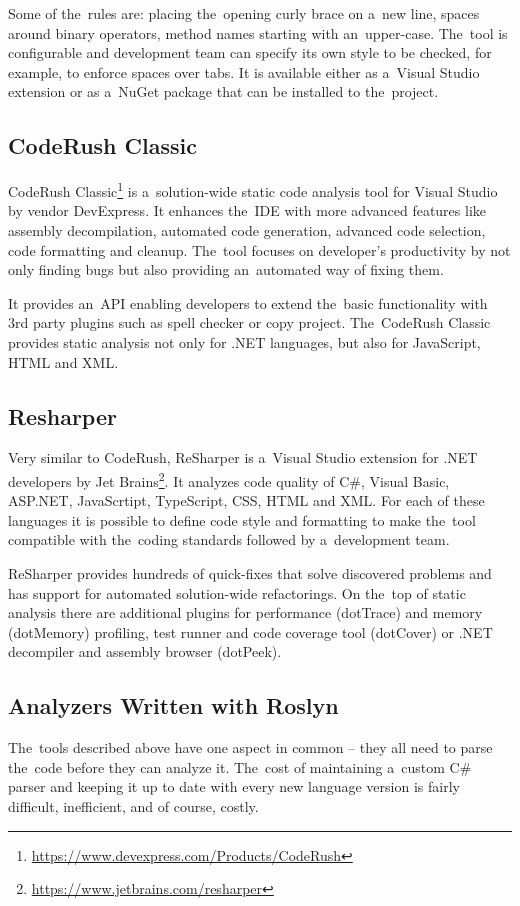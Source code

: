 \documentclass[
  digital, %
  table,   %
  lof,     %
  lot,     %
  oneside,
]{fithesis3}
\begin{document}
Some of the~rules are: placing the~opening curly brace on a~new line, spaces around binary operators, method names starting with an~upper-case. The~tool is configurable and development team can specify its own style to be checked, for example, to enforce spaces over tabs. It is available either as a~Visual Studio extension or as a~NuGet package that can be installed to the~project.

\subsection{CodeRush Classic}
CodeRush Classic\footnote{\url{https://www.devexpress.com/Products/CodeRush}} is a~solution-wide static code analysis tool for Visual Studio by vendor DevExpress. It enhances the~IDE with more advanced features like assembly decompilation, automated code generation, advanced code selection, code formatting and cleanup. The~tool focuses on developer's productivity by not only finding bugs but also providing an~automated way of fixing them.

It provides an~API enabling developers to extend the~basic functionality with 3rd party plugins such as spell checker or copy project. The~CodeRush Classic provides static analysis not only for .NET languages, but also for JavaScript, HTML and XML.

\subsection{Resharper}
Very similar to CodeRush, ReSharper is a~Visual Studio extension for .NET developers by Jet Brains\footnote{\url{https://www.jetbrains.com/resharper}}. It analyzes code quality of C\#, Visual Basic, ASP.NET, JavaScrtipt, TypeScript, CSS, HTML and XML. For each of these languages it is possible to define code style and formatting to make the~tool compatible with the~coding standards followed by a~development team. 

ReSharper provides hundreds of quick-fixes that solve discovered problems and has support for automated solution-wide refactorings. On the~top of static analysis there are additional plugins for performance (dotTrace) and memory (dotMemory) profiling, test runner and code coverage tool (dotCover) or .NET decompiler and assembly browser (dotPeek).


\subsection{Analyzers Written with Roslyn}
The~tools described above have one aspect in common -- they all need to parse the~code before they can analyze it. The~cost of maintaining a~custom C\# parser and keeping it up to date with every new language version is fairly difficult, inefficient, and of course, costly. 
\end{document}
